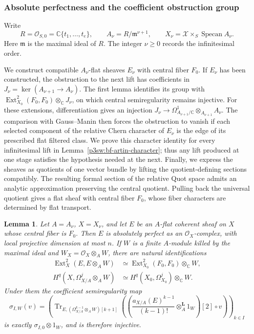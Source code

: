\documentclass[11pt]{article}
\newcommand{\C}{\mathbb C}
\newtheorem{lemma}[theorem]{Lemma}
\numberwithin{equation}{section}
\begin{document}
\subsubsection{Absolute perfectness and the coefficient obstruction group}

Write
\[
 R=\mathcal O_{S,0}=\C\{t_1,\ldots,t_e\},\qquad
 A_\nu=R/\mathfrak m^{\nu+1},\qquad
 X_\nu=\mathcal X\times_S\operatorname{Specan}A_\nu.
\]
Here \(\mathfrak m\) is the maximal ideal of \(R\).  The integer
\(\nu\geq0\) records the infinitesimal order.

We construct compatible \(A_\nu\)-flat sheaves \(E_\nu\) with
central fiber \(F_0\).  If \(E_\nu\) has been constructed, the
obstruction to the next lift has coefficients in
\(J_\nu=\ker(A_{\nu+1}\to A_\nu)\).  The first lemma identifies
its group with
\(\operatorname{Ext}^2_{X_0}(F_0,F_0)\otimes_\C J_\nu\), on
which central semiregularity remains injective.  For these extensions,
differentiation gives an injection
\(J_\nu\to\Omega^1_{A_{\nu+1}/\C}\otimes_{A_{\nu+1}}A_\nu\).
The comparison with Gauss--Manin then forces the obstruction to vanish
if each selected component of the relative Chern character of
\(E_\nu\) is the edge of its prescribed flat filtered class.
We prove this character identity for every
infinitesimal lift in Lemma~\ref{p3sw:bf-artin-character}; thus any
lift produced at one stage satisfies the hypothesis needed at the next.
Finally, we express the sheaves as quotients of one vector bundle by
lifting the quotient-defining sections compatibly.  The resulting
formal section of the relative Quot space admits an analytic
approximation preserving the central quotient.  Pulling back the universal
quotient gives a flat sheaf with central fiber \(F_0\), whose fiber
characters are determined by flat transport.

\begin{lemma}
\label{p3sw:bf-coefficients}
Let \(A=A_\nu\), \(X=X_\nu\), and let \(E\) be an \(A\)-flat
coherent sheaf on \(X\) whose central fiber is \(F_0\).
Then \(E\) is absolutely perfect as an \(\mathcal O_X\)-complex,
with local projective dimension at most \(n\).  If \(W\) is a
finite \(A\)-module killed by the maximal ideal and
\(W_X=\mathcal O_X\otimes_AW\), there are natural identifications
\begin{equation}
\label{p3sw:bf-coefficient-identities}
 \begin{split}
 \operatorname{Ext}^2_X(E,E\otimes_AW)
   &\simeq\operatorname{Ext}^2_{X_0}(F_0,F_0)\otimes_\C W,\\
 H^q(X,\Omega^j_{X/A}\otimes_AW)
   &\simeq H^q(X_0,\Omega_{X_0}^j)\otimes_\C W.
 \end{split}
\end{equation}
Under them the coefficient semiregularity map
\[
 \sigma_{I,W}(v)=
 \left(\operatorname{Tr}_{E,(\Omega_{X/A}^{k-1}\otimes_AW)[k+1]}
 \left(\left(\frac{a_{X/A}(E)^{k-1}}{(k-1)!}
       \otimes_A^{\mathbf L}1_W\right)[2]\circ v\right)\right)_{k\in I}
\]
is exactly \(\sigma_{I,0}\otimes1_W\), and is therefore injective.
\end{lemma}
\end{document}
